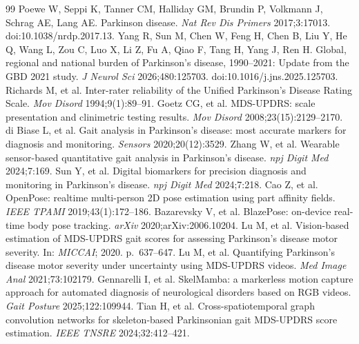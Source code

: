 \documentclass[preprint,12pt]{elsarticle}
\begin{document}

\begin{thebibliography}{99}
 Poewe W, Seppi K, Tanner CM, Halliday GM, Brundin P, Volkmann J, Schrag AE, Lang AE. Parkinson disease. \textit{Nat Rev Dis Primers} 2017;3:17013. doi:10.1038/nrdp.2017.13.
 Yang R, Sun M, Chen W, Feng H, Chen B, Liu Y, He Q, Wang L, Zou C, Luo X, Li Z, Fu A, Qiao F, Tang H, Yang J, Ren H. Global, regional and national burden of Parkinson's disease, 1990--2021: Update from the GBD 2021 study. \textit{J Neurol Sci} 2026;480:125703. doi:10.1016/j.jns.2025.125703.
 Richards M, et al. Inter-rater reliability of the Unified Parkinson's Disease Rating Scale. \textit{Mov Disord} 1994;9(1):89--91.
 Goetz CG, et al. MDS-UPDRS: scale presentation and clinimetric testing results. \textit{Mov Disord} 2008;23(15):2129--2170.
 di Biase L, et al. Gait analysis in Parkinson's disease: most accurate markers for diagnosis and monitoring. \textit{Sensors} 2020;20(12):3529.
 Zhang W, et al. Wearable sensor-based quantitative gait analysis in Parkinson's disease. \textit{npj Digit Med} 2024;7:169.
 Sun Y, et al. Digital biomarkers for precision diagnosis and monitoring in Parkinson's disease. \textit{npj Digit Med} 2024;7:218.
 Cao Z, et al. OpenPose: realtime multi-person 2D pose estimation using part affinity fields. \textit{IEEE TPAMI} 2019;43(1):172--186.
 Bazarevsky V, et al. BlazePose: on-device real-time body pose tracking. \textit{arXiv} 2020;arXiv:2006.10204.
 Lu M, et al. Vision-based estimation of MDS-UPDRS gait scores for assessing Parkinson's disease motor severity. In: \textit{MICCAI}; 2020. p.\ 637--647.
 Lu M, et al. Quantifying Parkinson's disease motor severity under uncertainty using MDS-UPDRS videos. \textit{Med Image Anal} 2021;73:102179.
 Gennarelli I, et al. SkelMamba: a markerless motion capture approach for automated diagnosis of neurological disorders based on RGB videos. \textit{Gait Posture} 2025;122:109944.
 Tian H, et al. Cross-spatiotemporal graph convolution networks for skeleton-based Parkinsonian gait MDS-UPDRS score estimation. \textit{IEEE TNSRE} 2024;32:412--421.

\end{thebibliography}
\end{document}
